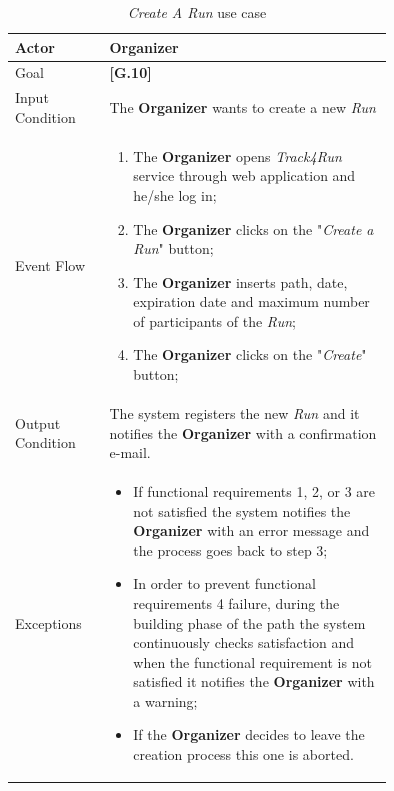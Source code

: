 \begin{center}
\begin{table}[H]
\begin{tabular}{ | l | p{0.75\linewidth} | }
  \hline
    Actor & \textbf{Organizer} \\ \hline
    Goal & \textbf{[G.10]} \\ \hline
    Input Condition & The \textbf{Organizer} wants to create a new \textit{Run} \\ \hline
    Event Flow & \begin{minipage}[t]{0.7\textwidth}
      \begin{enumerate}
        \item The \textbf{Organizer} opens \textit{Track4Run} service through web application and he/she log in;
        \item The \textbf{Organizer} clicks on the "\textit{Create a Run}" button;
        \item The \textbf{Organizer} inserts path, date, expiration date and maximum number of participants of the \textit{Run};
        \item The \textbf{Organizer} clicks on the "\textit{Create}" button;
      \end{enumerate}
    \smallskip
  \end{minipage} \\ \hline
  Output Condition & The system registers the new \textit{Run} and it notifies the \textbf{Organizer} with a confirmation e-mail. \\ \hline
  Exceptions & \begin{minipage}[t]{0.7\textwidth}
    \begin{itemize}
      \smallskip
      \item If functional requirements 1, 2, or 3 are not satisfied the system notifies the \textbf{Organizer} with an error message and the process goes back to step 3;
      \item In order to prevent functional requirements 4 failure, during the building phase of the path the system continuously checks satisfaction and when the functional requirement is not satisfied it notifies the \textbf{Organizer} with a warning;
      \item If the \textbf{Organizer} decides to leave the creation process this one is aborted.
    \end{itemize}
    \smallskip
  \end{minipage}  \\ \hline
\end{tabular}
\caption{\textit{Create A Run} use case}
\label{table:createRunTable}
\end{table}
\end{center}

